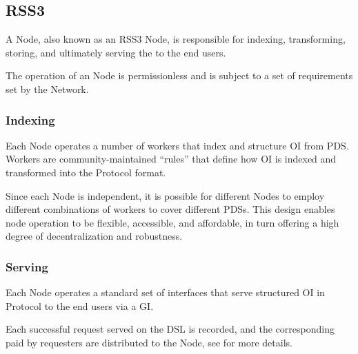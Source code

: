 \subsection{RSS3 }
\label{subsec:SN}

A \gls{Node}, also known as an RSS3 Node, is responsible for indexing, transforming, storing, and ultimately serving the  to the end users.

The operation of an \gls{Node} is permissionless and is subject to a set of requirements set by the Network.

\subsubsection{Indexing}
Each \gls{Node} operates a number of workers that index and structure \gls{OI} from \gls{PDS}.
Workers are community-maintained ``rules'' that define how \gls{OI} is indexed and transformed into the \gls{Protocol} format.

Since each \gls{Node} is independent, it is possible for different \glspl{Node} to employ different combinations of workers to cover different \glspl{PDS}.
This design enables node operation to be flexible, accessible, and affordable, in turn offering a high degree of decentralization and robustness.

\subsubsection{Serving}
Each \gls{Node} operates a standard set of interfaces that serve structured \gls{OI} in \gls{Protocol} to the end users via a \gls{GI}.

Each successful request served on the \gls{DSL} is recorded, and the corresponding  paid by requesters are distributed to the \gls{Node}, see  for more details.
